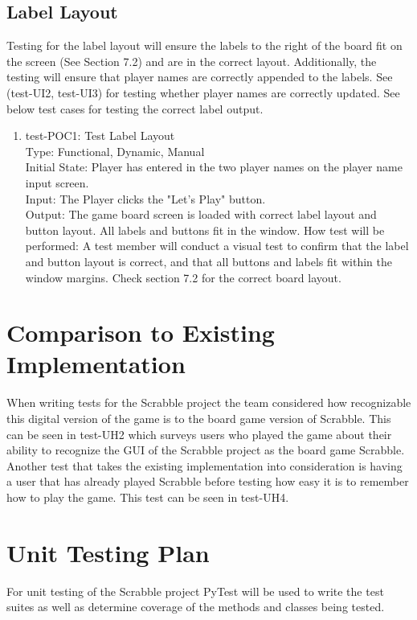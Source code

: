 \documentclass[12pt, titlepage]{article}
\begin{document}
\subsection{Label Layout}

Testing for the label layout will ensure the labels to the right of the board fit on the screen (See Section 7.2) and are in the correct layout. Additionally, the testing will ensure that player names are correctly appended to the labels. See (test-UI2, test-UI3) for testing whether player names are correctly updated. See below test cases for testing the correct label output.

\begin{enumerate}
    \item{test-POC1: Test Label Layout\\} 
    Type: Functional, Dynamic, Manual\\
    Initial State: Player has entered in the two player names on the player name input screen. \\
    Input: The Player clicks the "Let's Play" button.\\
    Output: The game board screen is loaded with correct label layout and button layout. All labels and buttons fit in the window.
    How test will be performed: A test member will conduct a visual test to confirm that the label and button layout is correct, and that all buttons and labels fit within the window margins. Check section 7.2 for the correct board layout.\\
\end{enumerate}
	
\section{Comparison to Existing Implementation}	%
When writing tests for the Scrabble project the team considered how recognizable this digital version of the game is to the board game version of Scrabble. This can be seen in test-UH2 which surveys users who played the game about their ability to recognize the GUI of the Scrabble project as the board game Scrabble.\\
Another test that takes the existing implementation into consideration is having a user that has already played Scrabble before testing how easy it is to remember how to play the game. This test can be seen in test-UH4.
\section{Unit Testing Plan}%
For unit testing of the Scrabble project PyTest will be used to write the test suites as well as determine coverage of the methods and classes being tested. 
\end{document}
